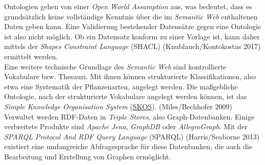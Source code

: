 \documentclass{article}
\begin{document}
        Ontologien gehen von einer \emph{Open World Assumption} aus, was bedeutet, dass es grundsätzlich keine vollständige Kenntnis über die im \emph{Semantic Web} enthaltenen Daten geben kann. Eine Validierung bestehender Datensätze gegen eine Ontologie ist also nicht möglich. Ob ein Datensatz konform zu einer Vorlage ist, kann daher mittels der \emph{Shapes Constraint Language} (SHACL) (Knublauch/Kontokostas 2017) ermittelt werden.\\
            
        Eine weitere technische Grundlage des \emph{Semantic Web} sind kontrollierte Vokabulare bzw. Thesauri. Mit ihnen können strukturierte Klassifikationen, also etwa eine Systematik der Pflanzenarten, angelegt werden. Die maßgebliche Ontologie, nach der strukturierte Vokabulare angelegt werden können, ist das \emph{Simple Knowledge Organisation System} (\href{http://gams.uni-graz.at/o:konde.132}{SKOS}). (Miles/Bechhofer 2009)\\
            
        Verwaltet werden RDF-Daten in \emph{Triple Stores}, also Graph-Datenbanken. Einige verbreitete Produkte sind \emph{Apache Jena}, \emph{GraphDB} oder \emph{AllegroGraph}. Mit der \emph{SPARQL Protocol And RDF Query Language} (SPARQL) (Harris/Seaborne 2013) existiert eine umfangreiche Abfragesprache für diese Datenbanken, die auch die Bearbeitung und Erstellung von Graphen ermöglicht.\\
            
\end{document}
